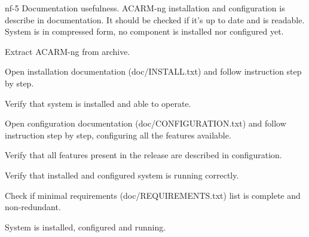 \testCase
{nf-5}
{Documentation usefulness.}
{ACARM-ng installation and configuration is describe in documentation. It should be checked if it's up to date and is readable.}
{System is in compressed form, no component is installed nor configured yet.}
{
\begin{enumerate*}
\item Extract ACARM-ng from archive.
\item Open installation documentation (doc/INSTALL.txt) and follow instruction step by step.
\item Verify that system is installed and able to operate.
\item Open configuration documentation (doc/CONFIGURATION.txt) and follow instruction step by step, configuring all the features available.
\item Verify that all features present in the release are described in configuration.
\item Verify that installed and configured system is running correctly.
\item Check if minimal requirements (doc/REQUIREMENTS.txt) list is complete and non-redundant.
\end{enumerate*}
}
{System is installed, configured and running.}
{}
